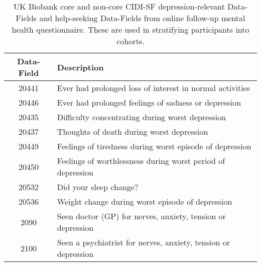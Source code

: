 \begin{table*}[t]
\begin{center}
  \small
  \begin{tabular}{ c | l }
    \toprule
    \textbf{Data-Field} & \textbf{Description} \\
    \midrule
    20441               & Ever had prolonged loss of interest in normal activities    \\
    20446               & Ever had prolonged feelings of sadness or depression        \\
    \midrule
    20435               & Difficulty concentrating during worst depression            \\
    20437               & Thoughts of death during worst depression                   \\
    20449               & Feelings of tiredness during worst episode of depression    \\
    20450               & Feelings of worthlessness during worst period of depression \\
    20532               & Did your sleep change?                                      \\
    20536               & Weight change during worst episode of depression            \\
    \midrule
    2090                & Seen doctor (GP) for nerves, anxiety, tension or depression  \\
    2100                & Seen a psychiatrist for nerves, anxiety, tension or depression \\
    \bottomrule
  \end{tabular}
  \caption{
    UK Biobank core and non-core CIDI-SF depression-relevant Data-Fields and help-seeking Data-Fields from online follow-up mental health questionnaire.
    These are used in stratifying participants into cohorts.
  }\label{tab:CIDI-SF-Data-Fields}
\end{center}
\end{table*}


